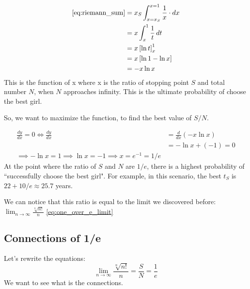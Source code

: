 \documentclass{article}
\begin{document}
\begin{align}
    \eqref{eq:riemann_sum} &=x_S\int_{x=x_S}^{x=1}\frac{1}{x}\cdot  dx \nonumber \\
    &=x\int_{x}^{1}\frac{1}{t} \, dt \nonumber \\
    &=x\left[ \ln{t} \right]_{x}^{1} \nonumber \\
    &=x\left[ \ln{1}-\ln{x} \right] \nonumber \\
    &= -x\ln x
\end{align}
This is the function of x where x is the ratio of stopping point $S$ and total number $N$, when $N$ approaches infinity. This is the ultimate probability of choose the best girl. 

So, we want to maximize the function, to find the best value of $S/N$. 

\begin{align}
    \frac{dy}{dx}=0 \iff\frac{dy}{dx} &= \frac{d}{dx}(-x\ln x)\nonumber\\
    &= -\ln x +(-1)=0 \nonumber\\
    \implies -\ln x = 1 \implies \ln x = -1 \implies x= e^{-1}=1/e
\end{align}
At the point where the ratio of $S$ and $N$ are $1/e$, there is a highest probability of ``successfully choose the best girl". For example, in this scenario, the best $t_S$ is $22+10/e \approx 25.7$ years.

We can notice that this ratio is equal to the limit we discovered before: $\lim_{n \to \infty} \frac{\sqrt[n]{n!}}{n}$ \eqref{eq:one_over_e_limit} 

\subsection{Connections of 1/e}

Let's rewrite the equations:
\begin{equation}
    \lim_{n \to \infty} \frac{\sqrt[n]{n!}}{n}= \frac{S}{N}=\frac{1}{e}
\end{equation}
We want to see what is the connections. 


\end{document}
